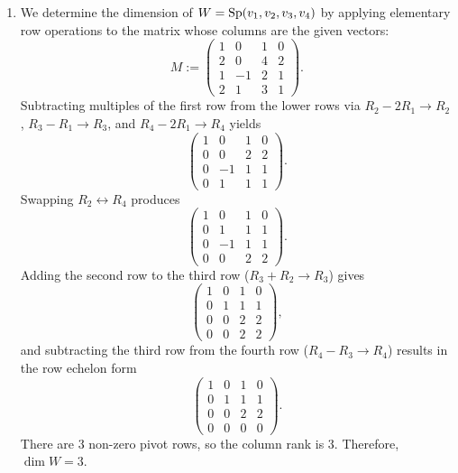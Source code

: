 \begin{exercisesolution*}
\label{sol:subspace_dimension_equations_basis_selection}
\begin{enumerate}[label=\textbf{(\alph*)}]
    \item We determine the dimension of $W = \operatorname{Sp}(v_1, v_2, v_3, v_4)$ by applying elementary row operations to the matrix whose columns are the given vectors:
    \[
        M := \begin{pmatrix}
            1 & 0 & 1 & 0 \\
            2 & 0 & 4 & 2 \\
            1 & -1 & 2 & 1 \\
            2 & 1 & 3 & 1
        \end{pmatrix}.
    \]
    Subtracting multiples of the first row from the lower rows via $R_2 - 2R_1 \to R_2$, $R_3 - R_1 \to R_3$, and $R_4 - 2R_1 \to R_4$ yields
    \[
        \begin{pmatrix}
            1 & 0 & 1 & 0 \\
            0 & 0 & 2 & 2 \\
            0 & -1 & 1 & 1 \\
            0 & 1 & 1 & 1
        \end{pmatrix}.
    \]
    Swapping $R_2 \leftrightarrow R_4$ produces
    \[
        \begin{pmatrix}
            1 & 0 & 1 & 0 \\
            0 & 1 & 1 & 1 \\
            0 & -1 & 1 & 1 \\
            0 & 0 & 2 & 2
        \end{pmatrix}.
    \]
    Adding the second row to the third row ($R_3 + R_2 \to R_3$) gives
    \[
        \begin{pmatrix}
            1 & 0 & 1 & 0 \\
            0 & 1 & 1 & 1 \\
            0 & 0 & 2 & 2 \\
            0 & 0 & 2 & 2
        \end{pmatrix},
    \]
    and subtracting the third row from the fourth row ($R_4 - R_3 \to R_4$) results in the row echelon form
    \[
        \begin{pmatrix}
            1 & 0 & 1 & 0 \\
            0 & 1 & 1 & 1 \\
            0 & 0 & 2 & 2 \\
            0 & 0 & 0 & 0
        \end{pmatrix}.
    \]
    There are $3$ non-zero pivot rows, so the column rank is $3$. Therefore, $\dim W = 3$.


\end{enumerate}
\end{exercisesolution*}
